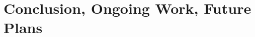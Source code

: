 \documentclass{beamer}
\begin{document}

\section{Conclusion, Ongoing Work, Future Plans}
\end{document}
